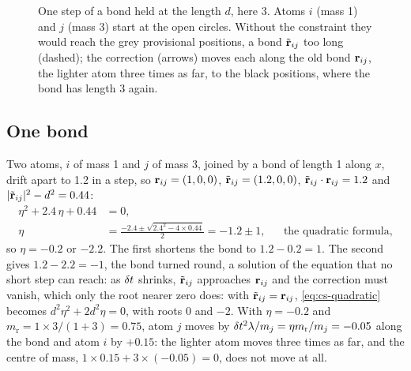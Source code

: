 \begin{figure}[htb]
\centering
{}
\caption{One step of a bond held at the length $d$, here 3. Atoms $i$
(mass 1) and $j$ (mass 3) start at the open circles. Without the
constraint they would reach the grey provisional positions, a bond
$\tilde{\bm{\mathrm{r}}}_{ij}$ too long (dashed); the correction (arrows) moves
each along the old bond $\bm{\mathrm{r}}_{ij}$, the lighter atom three times as
far, to the black positions, where the bond has length 3 again.}
\label{fig:cs-shake-geometry}
\end{figure}

\subsection*{One bond}

Two atoms, $i$ of mass 1 and $j$ of mass 3, joined by a bond of length 1
along $x$, drift apart to
1.2 in a step, so $\bm{\mathrm{r}}_{ij} = (1, 0, 0)$, $\tilde{\bm{\mathrm{r}}}_{ij} = (1.2,
0, 0)$, $\tilde{\bm{\mathrm{r}}}_{ij}\cdot\bm{\mathrm{r}}_{ij} = 1.2$ and
$\lvert\tilde{\bm{\mathrm{r}}}_{ij}\rvert^2 - d^2 = 0.44$:
\begin{align*}
   \eta^2 + 2.4\,\eta + 0.44 &= 0 ,\\
   \eta &= \frac{-2.4 \pm \sqrt{2.4^2 - 4\times0.44}}{2}
   = -1.2 \pm 1 ,
   && \text{the quadratic formula,}
\end{align*}
so $\eta = -0.2$ or $-2.2$. The first shortens the bond to $1.2 - 0.2 =
1$. The second gives $1.2 - 2.2 = -1$, the bond turned round, a solution
of the equation that no short step can reach: as $\delta t$ shrinks,
$\tilde{\bm{\mathrm{r}}}_{ij}$ approaches $\bm{\mathrm{r}}_{ij}$ and the correction must
vanish, which only the root nearer zero does: with $\tilde{\bm{\mathrm{r}}}_{ij} =
\bm{\mathrm{r}}_{ij}$, \cref{eq:cs-quadratic} becomes $d^2\eta^2 + 2d^2\eta = 0$,
with roots 0 and $-2$. With $\eta = -0.2$ and
$m_{\mathrm r} = 1\times3/(1 + 3) = 0.75$, atom $j$ moves by
$\delta t^2\lambda/m_j = \eta m_{\mathrm r}/m_j = -0.05$ along the bond and atom
$i$ by $+0.15$: the lighter atom moves three times as far, and the centre
of mass, $1\times0.15 + 3\times(-0.05) = 0$, does not move at all.

